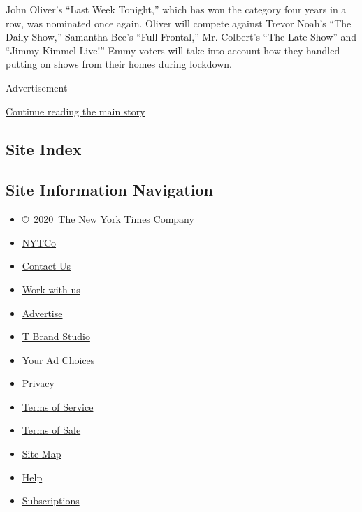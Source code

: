 John Oliver's ``Last Week Tonight,'' which has won the category four
years in a row, was nominated once again. Oliver will compete against
Trevor Noah's ``The Daily Show,'' Samantha Bee's ``Full Frontal,'' Mr.
Colbert's ``The Late Show'' and ``Jimmy Kimmel Live!'' Emmy voters will
take into account how they handled putting on shows from their homes
during lockdown.

Advertisement

\protect\hyperlink{after-bottom}{Continue reading the main story}

\hypertarget{site-index}{%
\subsection{Site Index}\label{site-index}}

\hypertarget{site-information-navigation}{%
\subsection{Site Information
Navigation}\label{site-information-navigation}}

\begin{itemize}
\tightlist
\item
  \href{https://help.nytimes3xbfgragh.onion/hc/en-us/articles/115014792127-Copyright-notice}{©~2020~The
  New York Times Company}
\end{itemize}

\begin{itemize}
\tightlist
\item
  \href{https://www.nytco.com/}{NYTCo}
\item
  \href{https://help.nytimes3xbfgragh.onion/hc/en-us/articles/115015385887-Contact-Us}{Contact
  Us}
\item
  \href{https://www.nytco.com/careers/}{Work with us}
\item
  \href{https://nytmediakit.com/}{Advertise}
\item
  \href{http://www.tbrandstudio.com/}{T Brand Studio}
\item
  \href{https://www.nytimes3xbfgragh.onion/privacy/cookie-policy\#how-do-i-manage-trackers}{Your
  Ad Choices}
\item
  \href{https://www.nytimes3xbfgragh.onion/privacy}{Privacy}
\item
  \href{https://help.nytimes3xbfgragh.onion/hc/en-us/articles/115014893428-Terms-of-service}{Terms
  of Service}
\item
  \href{https://help.nytimes3xbfgragh.onion/hc/en-us/articles/115014893968-Terms-of-sale}{Terms
  of Sale}
\item
  \href{https://spiderbites.nytimes3xbfgragh.onion}{Site Map}
\item
  \href{https://help.nytimes3xbfgragh.onion/hc/en-us}{Help}
\item
  \href{https://www.nytimes3xbfgragh.onion/subscription?campaignId=37WXW}{Subscriptions}
\end{itemize}
